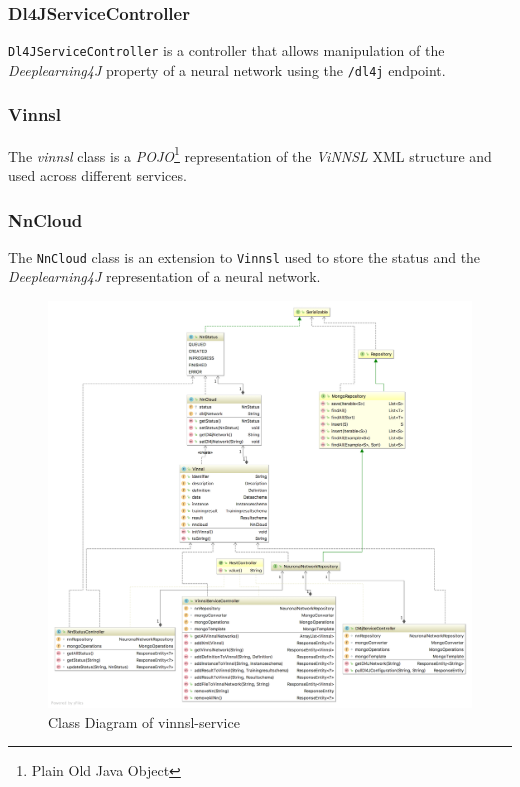 \subsubsection{Dl4JServiceController}\label{dl4jservicecontroller}

\texttt{Dl4JServiceController} is a controller that allows manipulation
of the \emph{Deeplearning4J} property of a neural network using the
\texttt{/dl4j} endpoint.

\subsubsection{Vinnsl}\label{vinnsl-1}

The \emph{vinnsl} class is a \emph{POJO}\footnote{Plain Old Java Object}
representation of the \emph{ViNNSL} XML structure and used across
different services.

\subsubsection{NnCloud}\label{nncloud}

The \texttt{NnCloud} class is an extension to \texttt{Vinnsl} used to
store the status and the \emph{Deeplearning4J} representation of a
neural network.

\begin{figure}
\centering
\includegraphics[width=17.00000cm]{images/uml-class-diagram-vinnsl-service}
\caption{Class Diagram of vinnsl-service \label{class_vinnsl-service}}
\end{figure}

